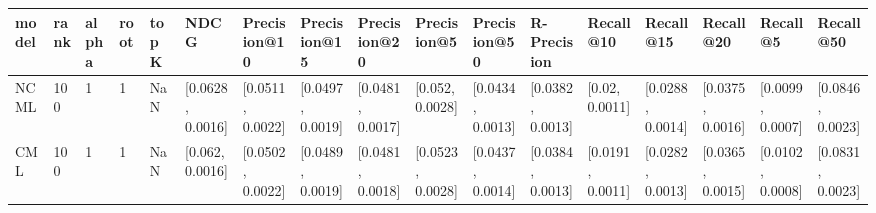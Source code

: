 \begin{tabular}{lllllllllllllllll}
\toprule
model & rank & alpha & root & topK &              NDCG &      Precision@10 &      Precision@15 &      Precision@20 &       Precision@5 &      Precision@50 &       R-Precision &         Recall@10 &         Recall@15 &         Recall@20 &          Recall@5 &         Recall@50 \\
\midrule
 NCML &  100 &     1 &    1 &  NaN &  [0.0628, 0.0016] &  [0.0511, 0.0022] &  [0.0497, 0.0019] &  [0.0481, 0.0017] &   [0.052, 0.0028] &  [0.0434, 0.0013] &  [0.0382, 0.0013] &    [0.02, 0.0011] &  [0.0288, 0.0014] &  [0.0375, 0.0016] &  [0.0099, 0.0007] &  [0.0846, 0.0023] \\
  CML &  100 &     1 &    1 &  NaN &   [0.062, 0.0016] &  [0.0502, 0.0022] &  [0.0489, 0.0019] &  [0.0481, 0.0018] &  [0.0523, 0.0028] &  [0.0437, 0.0014] &  [0.0384, 0.0013] &  [0.0191, 0.0011] &  [0.0282, 0.0013] &  [0.0365, 0.0015] &  [0.0102, 0.0008] &  [0.0831, 0.0023] \\
\bottomrule
\end{tabular}
